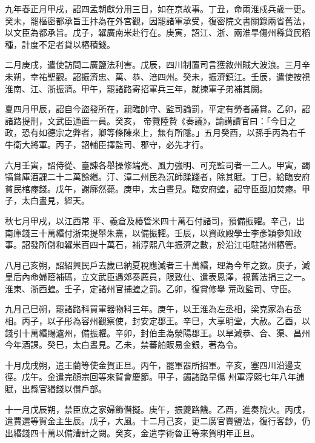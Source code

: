 \begin{pinyinscope}
 九年春正月甲戌，詔四孟朝獻分用三日，如在京故事。丁丑，命兩淮戍兵歲一更。癸未，罷樞密都承旨王抃為在外宮觀，因罷諸軍承受，復密院文書關錄兩省舊法，
 以文臣為都承旨。戊子，糴廣南米赴行在。庚寅，詔江、浙、兩淮旱傷州縣貸民稻種，計度不足者貸以樁積錢。



 二月庚戌，遣使訪問二廣鹽法利害。戊辰，四川制置司言獲敘州賊大波浪。三月辛未朔，幸祐聖觀。詔振濟忠、萬、恭、涪四州。癸未，振濟鎮江。壬辰，遣使按視淮南、江、浙振濟。甲午，罷諸路寄招軍兵三年，就揀軍子弟補其闕。



 夏四月甲辰，詔自今盜發所在，親臨帥守、監司論罰，平定有勞者議賞。乙卯，詔諸路提刑，文武臣通置一員。癸亥，
 帝覽陸贄《奏議》，諭講讀官曰：「今日之政，恐有如德宗之弊者，卿等條陳來上，無有所隱。」五月癸酉，以孫手丙為右千牛衛大將軍。丙子，詔輔臣擇監司、郡守，必先才行。



 六月壬寅，詔侍從、臺諫各舉操修端亮、風力強明、可充監司者一二人。甲寅，蠲犒賞庫酒課二十二萬餘緡。汀、漳二州民為沉師蹂踐者，除其賦。丁巳，給臨安府貧民棺瘞錢。戊午，謝廓然薨。庚申，太白晝見。臨安府蝗，詔守臣亟加焚瘞。甲子，太白晝見，經天。



 秋七月甲戌，以江西常
 平、義倉及樁管米四十萬石付諸司，預備振糶。辛己，出南庫錢三十萬緡付浙東提舉朱熹，以備振糶。壬辰，以資政殿學士李彥穎參知政事。詔發所儲和糴米百四十萬石，補淳熙八年振濟之數，於沿江屯駐諸州樁管。



 八月己亥朔，詔紹興民戶去歲已納夏稅應減者三十萬緡，理為今年之數。庚子，減皇后內命婦蔭補碼，立文武臣遇郊奏薦員，限致仕、遣表恩澤，視舊法捐三之一。淮東、浙西蝗。壬子，定諸州官捕蝗之罰。乙卯，復賞修舉
 荒政監司、守臣。



 九月己巳朔，罷諸路科買軍器物料三年。庚午，以王淮為左丞相，梁克家為右丞相。丙子，以子彤為容州觀察使，封安定郡王。辛巳，大享明堂，大赦。乙酉，以錢引十萬緡賜瀘州，備振糶。辛卯，封伯圭為滎陽郡王。以旱減恭、合、渠、昌州今年酒課。癸巳，太白晝見。乙未，禁蕃舶販易金銀，著為令。



 十月戊戌朔，遣王藺等使金賀正旦。丙午，罷軍器所招軍。辛亥，塞四川沿邊支徑。戊午。金遣完顏宗回等來賀會慶節。甲子，蠲諸路旱傷
 州軍淳熙七年八年逋賦，出縣官緡錢以償戶部。



 十一月戊辰朔，禁臣庶之家婦飾僭擬。庚午，振夔路饑。乙酉，進奏院火。丙戌，遣賈選等賀金主生辰。戊子，大風。十二月己亥，更二廣官賣鹽法，復行客鈔，仍出緡錢四十萬以備漕計之闕。癸亥，金遣孛術魯正等來賀明年正旦。




\end{pinyinscope}
